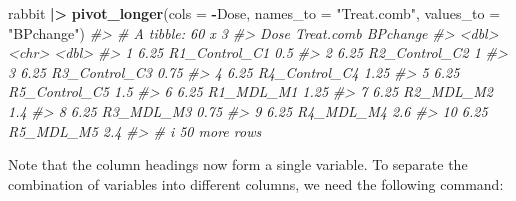 \documentclass[
]{book}
\newenvironment{Shaded}{\begin{snugshade}}{\end{snugshade}}
\newcommand{\AttributeTok}[1]{\textcolor[rgb]{0.13,0.29,0.53}{#1}}
\newcommand{\CommentTok}[1]{\textcolor[rgb]{0.56,0.35,0.01}{\textit{#1}}}
\newcommand{\FunctionTok}[1]{\textcolor[rgb]{0.13,0.29,0.53}{\textbf{#1}}}
\newcommand{\NormalTok}[1]{#1}
\newcommand{\SpecialCharTok}[1]{\textcolor[rgb]{0.81,0.36,0.00}{\textbf{#1}}}
\newcommand{\StringTok}[1]{\textcolor[rgb]{0.31,0.60,0.02}{#1}}
\begin{document}
\begin{Shaded}
\begin{Highlighting}[]
\NormalTok{rabbit }\SpecialCharTok{|\textgreater{}} \FunctionTok{pivot\_longer}\NormalTok{(}\AttributeTok{cols =} \SpecialCharTok{{-}}\NormalTok{Dose, }\AttributeTok{names\_to =} \StringTok{"Treat.comb"}\NormalTok{, }
                       \AttributeTok{values\_to =} \StringTok{"BPchange"}\NormalTok{)}
\CommentTok{\#\textgreater{} \# A tibble: 60 x 3}
\CommentTok{\#\textgreater{}     Dose Treat.comb    BPchange}
\CommentTok{\#\textgreater{}    \textless{}dbl\textgreater{} \textless{}chr\textgreater{}            \textless{}dbl\textgreater{}}
\CommentTok{\#\textgreater{}  1  6.25 R1\_Control\_C1     0.5 }
\CommentTok{\#\textgreater{}  2  6.25 R2\_Control\_C2     1   }
\CommentTok{\#\textgreater{}  3  6.25 R3\_Control\_C3     0.75}
\CommentTok{\#\textgreater{}  4  6.25 R4\_Control\_C4     1.25}
\CommentTok{\#\textgreater{}  5  6.25 R5\_Control\_C5     1.5 }
\CommentTok{\#\textgreater{}  6  6.25 R1\_MDL\_M1         1.25}
\CommentTok{\#\textgreater{}  7  6.25 R2\_MDL\_M2         1.4 }
\CommentTok{\#\textgreater{}  8  6.25 R3\_MDL\_M3         0.75}
\CommentTok{\#\textgreater{}  9  6.25 R4\_MDL\_M4         2.6 }
\CommentTok{\#\textgreater{} 10  6.25 R5\_MDL\_M5         2.4 }
\CommentTok{\#\textgreater{} \# i 50 more rows}
\end{Highlighting}
\end{Shaded}

Note that the column headings now form a single variable. To separate the combination of variables into different columns, we need the following command:
\end{document}
